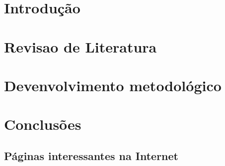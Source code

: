 \documentclass[qualificacao, pre-defesa]{packages/icmc}
\begin{document}
\textual


\chapter{Introdução}
\label{chapter:introducao}


\chapter{Revisao de Literatura}
\label{chapter:revisao-literatura}


\chapter{Devenvolvimento metodológico}
\label{chapter:desenvolvimento-metodologico}


\chapter{Conclusões}
\label{chapter:conclusoes}


%

\postextual


\begin{anexosenv}

    \chapter{Páginas interessantes na Internet}
    \label{chapter:paginas-interessantes}
    

\end{anexosenv}
\end{document}
